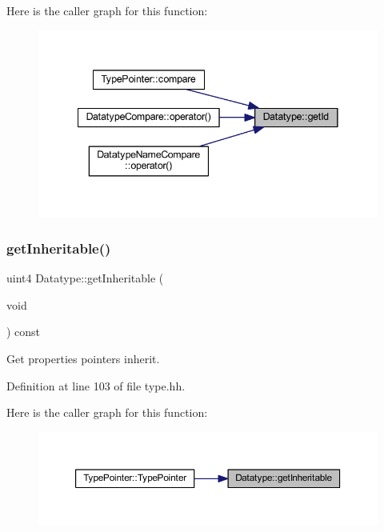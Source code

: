 Here is the caller graph for this function\+:
\nopagebreak
\begin{figure}[H]
\begin{center}
\leavevmode
\includegraphics[width=341pt]{class_datatype_a6b0374e8a6d4cbb1d2369dd055d72127_icgraph}
\end{center}
\end{figure}
\mbox{\label{class_datatype_aa33df89b91441c409f59676d7bc1b0bd}} 
\subsubsection{\texorpdfstring{getInheritable()}{getInheritable()}}
{\footnotesize\ttfamily uint4 Datatype\+::get\+Inheritable (\begin{DoxyParamCaption}\item[{void}]{ }\end{DoxyParamCaption}) const\hspace{0.3cm}{\ttfamily [inline]}}



Get properties pointers inherit. 



Definition at line 103 of file type.\+hh.

Here is the caller graph for this function\+:
\nopagebreak
\begin{figure}[H]
\begin{center}
\leavevmode
\includegraphics[width=350pt]{class_datatype_aa33df89b91441c409f59676d7bc1b0bd_icgraph}
\end{center}
\end{figure}
\mbox{\label{class_datatype_abcf2621c981c277f00a53b4526b3e610}} 

